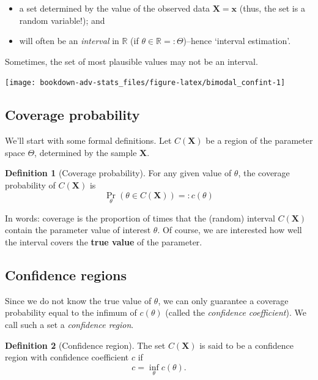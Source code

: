 \documentclass[
]{book}
\providecommand{\tightlist}{%
  \setlength{\itemsep}{0pt}\setlength{\parskip}{0pt}}
\newcommand{\bx}{{\boldsymbol x}}
\newcommand{\bX}{{\boldsymbol X}}
\newcommand{\bbR}{\mathbb{R}}
\theoremstyle{definition}
\newtheorem{definition}{Definition}[chapter]
\theoremstyle{definition}
\theoremstyle{definition}
\theoremstyle{definition}
\theoremstyle{remark}
\begin{document}
\begin{itemize}
\tightlist
\item
  a set determined by the value of the observed data \(\bX = \bx\) (thus, the set is a random variable!); and
\item
  will often be an \emph{interval} in \(\bbR\) (if \(\theta\in\bbR=:\Theta\))--hence `interval estimation'.
\end{itemize}

Sometimes, the set of most plausible values may not be an interval.

\begin{center}\texttt{[image: bookdown-adv-stats\_files/figure-latex/bimodal\_confint-1]} \end{center}

\hypertarget{coverage-probability}{%
\subsection{Coverage probability}\label{coverage-probability}}

We'll start with some formal definitions.
Let \(C(\bX)\) be a region of the parameter space \(\Theta\), determined by the sample \(\bX\).

\begin{definition}[Coverage probability]
For any given value of \(\theta\), the coverage probability of \(C(\bX)\) is
\[
\Pr_\theta \left( \theta \in C(\bX) \right) =: c(\theta)
\]
\end{definition}

In words: coverage is the proportion of times that the (random) interval \(C(\bX)\) contain the parameter value of interest \(\theta\).
Of course, we are interested how well the interval covers the \textbf{true value} of the parameter.

\hypertarget{confidence-regions}{%
\subsection{Confidence regions}\label{confidence-regions}}

Since we do not know the true value of \(\theta\), we can only guarantee a coverage probability equal to the infimum of \(c(\theta)\) (called the \emph{confidence coefficient}).
We call such a set a \emph{confidence region}.

\begin{definition}[Confidence region]
The set \(C(\bX)\) is said to be a confidence region with confidence coefficient \(c\) if
\[
c = \inf_\theta c(\theta).
\]
\end{definition}
\end{document}
